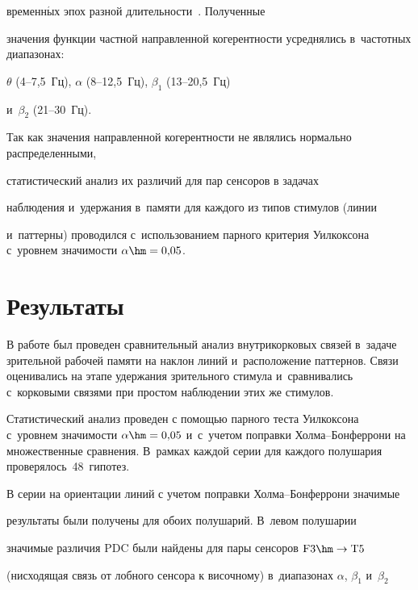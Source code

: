 временн$\acute{\mbox{ы}}$х эпох разной длительности~\cite{monk, de}. Полученные 


значения функции частной направленной когерентности усреднялись в~частотных диапазонах:


$\theta$ (4--7,5~Гц), $\alpha$ (8--12,5~Гц), $\beta_1$ (13--20,5~Гц)


и~$\beta_2$ (21--30~Гц).





Так как значения направленной когерентности не являлись нормально распределенными,


статистический анализ их различий для пар сенсоров в задачах


наблюдения и~удержания в~памяти для каждого из типов стимулов (линии


и~паттерны) проводился с~использованием парного критерия Уилкоксона с~уровнем значимости $\alpha \hm= 0{,}05$.





\section{Результаты}





В работе был проведен сравнительный анализ внутрикорковых связей в~задаче зрительной рабочей памяти на наклон линий и~расположение паттернов. Связи оценивались на этапе удержания зрительного стимула и~сравнивались с~корковыми связями при простом наблюдении этих же стимулов.





Статистический анализ проведен с помощью парного теста Уилкоксона с~уровнем значимости $\alpha \hm= 0{,}05$ и~с~учетом поправки Хол\-ма--Бон\-фер\-ро\-ни на множественные сравнения. В~рамках каждой серии для каждого полушария проверялось~48~гипотез.





В серии на ориентации линий с учетом поправки Хол\-ма--Бон\-фер\-ро\-ни значимые 


результаты были получены для обоих полушарий. В~левом полушарии


значимые различия PDC были найдены для пары сенсоров $\mathrm{F3} \hm\rightarrow \mathrm{T5}$ 


(нисходящая связь от лобного сенсора к височному) в~диапазонах $\alpha$, $\beta_1$ и~$\beta_2$ 


